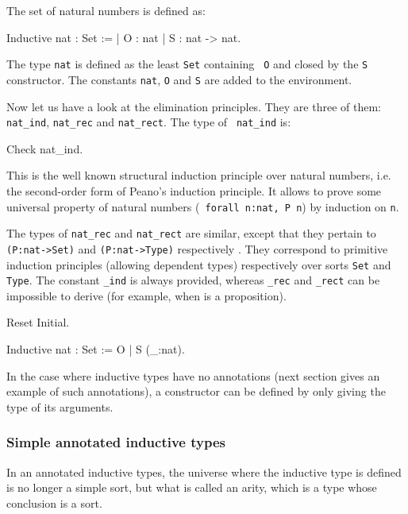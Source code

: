 The set of natural numbers is defined as:
\begin{coq_example}
Inductive nat : Set :=
  | O : nat
  | S : nat -> nat.
\end{coq_example}

The type {\tt nat} is defined as the least \verb:Set: containing {\tt
  O} and closed by the {\tt S} constructor. The constants {\tt nat},
{\tt O} and {\tt S} are added to the environment.

Now let us have a look at the elimination principles. They are three
of them:
{\tt nat\_ind}, {\tt nat\_rec} and {\tt nat\_rect}.  The type of {\tt
  nat\_ind} is:
\begin{coq_example}
Check nat_ind.
\end{coq_example}

This is the well known structural induction principle over natural
numbers, i.e. the second-order form of Peano's induction principle.
It allows to prove some universal property of natural numbers ({\tt
forall n:nat, P n}) by induction on {\tt n}.

The types of {\tt nat\_rec} and {\tt nat\_rect} are similar, except
that they pertain to {\tt (P:nat->Set)} and {\tt (P:nat->Type)}
respectively . They correspond to primitive induction principles
(allowing dependent types) respectively over sorts \verb:Set: and
\verb:Type:. The constant {\ident}{\tt \_ind} is always provided,
whereas {\ident}{\tt \_rec} and {\ident}{\tt \_rect} can be impossible
to derive (for example, when {\ident} is a proposition).

\begin{coq_eval}
Reset Initial.
\end{coq_eval}
\begin{Variants}
\item 
\begin{coq_example*}
Inductive nat : Set := O | S (_:nat).
\end{coq_example*}
In the case where inductive types have no annotations (next section
gives an example of such annotations), 
a constructor can be defined by only giving the type of
its arguments.
\end{Variants}

\subsubsection{Simple annotated inductive types}

In an annotated inductive types, the universe where the inductive
type is defined is no longer a simple sort, but what is called an
arity, which is a type whose conclusion is a sort.

